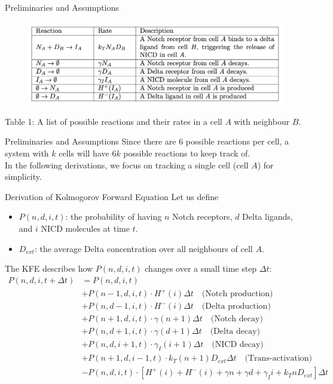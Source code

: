 \documentclass[aspectratio=169]{beamer}
\begin{document}
\begin{frame}{Preliminaries and Assumptions}
\begin{figure}
    \centering
    \includegraphics[width=0.9\linewidth]{image0.png}
\end{figure}
    Table 1: A list of possible reactions and their rates in a cell $A$ with neighbour $B$.
\end{frame}

\begin{frame}{Preliminaries and Assumptions}
Since there are $6$ possible reactions per cell, a system with $k$ cells will have $6k$ possible reactions to keep track of. \\
\hfill\break
In the following derivations, we focus on tracking a single cell (cell $A$) for simplicity.
\end{frame}

\begin{frame}{Derivation of Kolmogorov Forward Equation}
Let us define
\begin{itemize}
    \small \item $P(n,d,i,t)$: the probability of having $n$ Notch receptors, $d$ Delta ligands, and $i$ NICD molecules at time $t$.
    \small \item $D_{ext}$: the average Delta concentration over all neighbours of cell $A$.
\end{itemize}
The KFE describes how $P(n,d,i,t)$ changes over a small time step $\Delta t$:
\small \begin{align*}
P(n,d,i,t+\Delta t) &= P(n,d,i,t) \\
&+ P(n-1,d,i,t) \cdot H^+(i) \Delta t \quad \text{(Notch production)} \\
&+ P(n,d-1,i,t) \cdot H^-(i) \Delta t \quad \text{(Delta production)} \\
&+ P(n+1,d,i,t) \cdot \gamma(n+1)\Delta t \quad \text{(Notch decay)} \\
&+ P(n,d+1,i,t) \cdot \gamma(d+1)\Delta t \quad \text{(Delta decay)} \\
&+ P(n,d,i+1,t) \cdot \gamma_I(i+1)\Delta t \quad \text{(NICD decay)} \\
&+ P(n+1,d,i-1,t) \cdot k_T(n+1)D_{ext}\Delta t \quad \text{(Trans-activation)} \\
&- P(n,d,i,t) \cdot [H^+(i) + H^-(i) + \gamma n + \gamma d + \gamma_I i + k_T n D_{ext}]\Delta t
\end{align*}
\end{frame}
\end{document}

